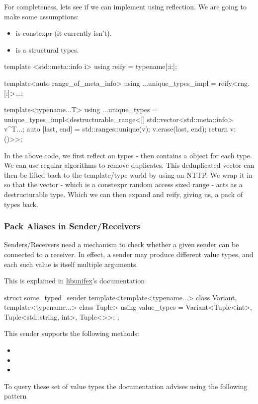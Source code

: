 \documentclass{wg21}
\begin{document}
For completeness, lets see if we can implement  using reflection.
We are going to make some assumptions:

\begin{itemize}
    \item {} is constexpr (it currently isn't).
    \item {} is a structural types.
\end{itemize}

\begin{colorblock}
template <std::meta::info i>
using reify =  typename[:i:];

template<auto range_of_meta_info>
using ...unique_types_impl = reify<rng.[:]>...;

template<typename...T>
using ...unique_types =
    unique_types_impl<destructurable_range<[] {
                std::vector<std::meta::info> v{^T...};
                auto [last, end] = std::ranges::unique(v);
                v.erase(last, end);
                return v;
            }()>{}>;
\end{colorblock}

In the above code, we first reflect on types -  then contains a  object for each type.
We can use regular algorithms to remove duplicates.
This deduplicated vector can then be lifted back to the template/type world by using an NTTP. We wrap it in 
so that the vector - which is a constexpr random access sized range - acts as a destructurable type.
Which we can then expand and reify, giving us, a pack of types back.


\subsubsection{Pack Aliases in Sender/Receivers}

Senders/Receivers  need a mechanism to check whether a given sender can be connected to a receiver.
In effect, a sender may produce different value types, and each such value is itself multiple arguments.

This is explained in \href{https://github.com/facebookexperimental/libunifex/blob/main/doc/concepts.md}{libunifex}'s documentation

\begin{colorblock}
    struct some_typed_sender {
        template<template<typename...> class Variant, template<typename...> class Tuple>
        using value_types = Variant<Tuple<int>,
        Tuple<std::string, int>,
        Tuple<>>;
    };
\end{colorblock}
This sender supports the following methods:
\begin{itemize}
    \item {}
    \item {}
    \item {}
\end{itemize}
To query these set of value types the documentation advises using the following pattern
\end{document}
